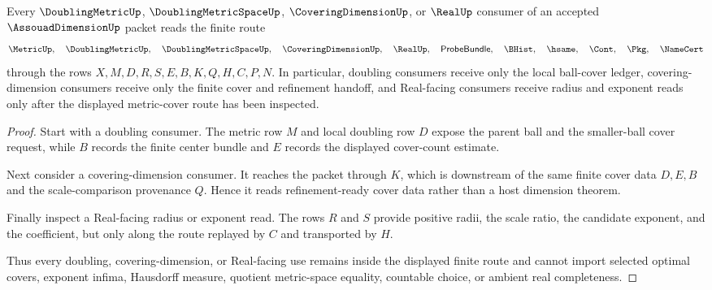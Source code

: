 \begin{theorem}
\label{thm:assouad-dimension-doubling-handoff}
Every $\DoublingMetricUp$, $\DoublingMetricSpaceUp$, $\CoveringDimensionUp$, or $\RealUp$ consumer of an accepted $\AssouadDimensionUp$ packet reads the finite route
$$
\MetricUp,\quad \DoublingMetricUp,\quad \DoublingMetricSpaceUp,\quad \CoveringDimensionUp,\quad \RealUp,\quad \mathsf{ProbeBundle},\quad \BHist,\quad \hsame,\quad \Cont,\quad \Pkg,\quad \NameCert
$$
through the rows $X,M,D,R,S,E,B,K,Q,H,C,P,N$. In particular, doubling consumers receive only the local ball-cover ledger, covering-dimension consumers receive only the finite cover and refinement handoff, and Real-facing consumers receive radius and exponent reads only after the displayed metric-cover route has been inspected.
\end{theorem}
\begin{proof}
Start with a doubling consumer. The metric row $M$ and local doubling row $D$ expose the parent ball and the smaller-ball cover request, while $B$ records the finite center bundle and $E$ records the displayed cover-count estimate.

Next consider a covering-dimension consumer. It reaches the packet through $K$, which is downstream of the same finite cover data $D,E,B$ and the scale-comparison provenance $Q$. Hence it reads refinement-ready cover data rather than a host dimension theorem.

Finally inspect a Real-facing radius or exponent read. The rows $R$ and $S$ provide positive radii, the scale ratio, the candidate exponent, and the coefficient, but only along the route replayed by $C$ and transported by $H$.

Thus every doubling, covering-dimension, or Real-facing use remains inside the displayed finite route and cannot import selected optimal covers, exponent infima, Hausdorff measure, quotient metric-space equality, countable choice, or ambient real completeness.
\end{proof}


